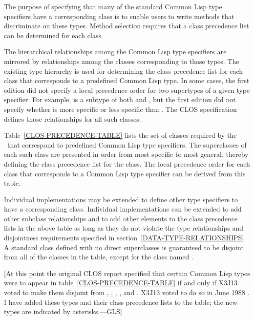 The purpose of specifying that many of the standard Common Lisp type
specifiers have a corresponding class is to enable users to write methods that
discriminate on these types.  
Method selection requires that a class precedence list can be
determined for each class. 

The hierarchical relationships among the Common Lisp type specifiers
are mirrored by relationships among the classes corresponding to those
types.  The existing type hierarchy is used for determining the
class precedence list for each class that corresponds to a predefined
Common Lisp type.  In some cases, the first edition
did not specify a local precedence order for two supertypes of a
given type specifier.  For example,  is a subtype of both
 and , but the first edition
did not specify whether  is more specific or less
specific than .  The CLOS specification defines those
relationships for all such classes.

Table~\ref{CLOS-PRECEDENCE-TABLE} lists the set of classes required by the \OS\
that correspond to predefined Common Lisp type specifiers.  The
superclasses of each such class are presented in order from most
specific to most general, thereby defining the class precedence list
for the class. The local precedence order for each class that
corresponds to a Common Lisp type specifier can be derived from this
table.

Individual implementations may be extended to define other type
specifiers to have a corresponding class.  Individual implementations
can be extended to add other subclass relationships and to add other
elements to the class precedence lists in the above table as long as
they do not violate the type relationships and disjointness
requirements specified in section~\ref{DATA-TYPE-RELATIONSHIPS}.
A standard class defined with no direct superclasses is guaranteed to
be disjoint from all of the classes in the table, except for the
class named \cdf{t}.

[At this point the original CLOS report specified that certain Common Lisp
types were to appear in table~\ref{CLOS-PRECEDENCE-TABLE} if and only if
X3J13 voted to make them disjoint from
, , , , and .
X3J13 voted to do so in June 1988
.  I have added these types
and their class precedence lists to the table; the new types are indicated
by asterisks.---GLS]


